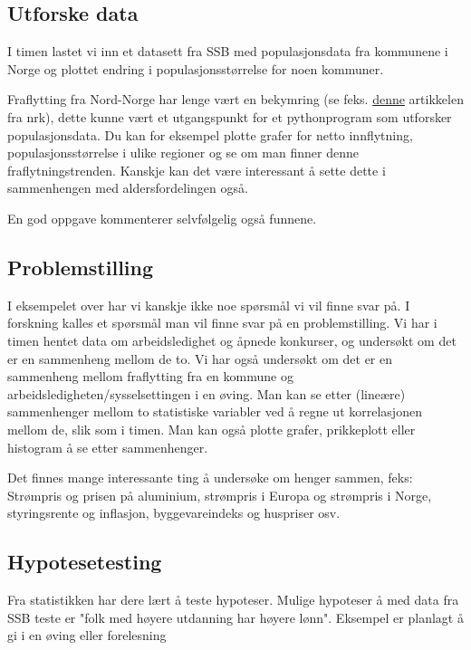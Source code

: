 \documentclass[12pt, titlepage]{article}
\begin{document}
\subsection*{Utforske data}

I timen lastet vi inn et datasett fra SSB med populasjonsdata fra kommunene i Norge og plottet endring i populasjonsstørrelse for noen kommuner.

Fraflytting fra Nord-Norge har lenge vært en bekymring (se feks. \href{https://www.nrk.no/tromsogfinnmark/4000-flyttet-fra-nord-norge-i-2022-1.16345861}{denne} artikkelen fra nrk),
dette kunne vært et utgangspunkt for et pythonprogram som utforsker populasjonsdata. Du kan for eksempel plotte grafer for netto innflytning, populasjonsstørrelse i ulike regioner og se om man finner denne fraflytningstrenden.
Kanskje kan det være interessant å sette dette i sammenhengen med aldersfordelingen også.

En god oppgave kommenterer selvfølgelig også funnene.

\subsection*{Problemstilling}

I eksempelet over har vi kanskje ikke noe spørsmål vi vil finne svar på. I forskning kalles et spørsmål man vil finne svar på en problemstilling. 
Vi har i timen hentet data om arbeidsledighet og åpnede konkurser, og undersøkt om det er en sammenheng mellom de to. Vi har også undersøkt om det er en sammenheng
mellom fraflytting fra en kommune og arbeidsledigheten/sysselsettingen i en øving.
Man kan se etter (lineære) sammenhenger mellom to statistiske variabler ved å regne ut korrelasjonen mellom de, slik som i timen. Man kan også plotte grafer, prikkeplott eller histogram
å se etter sammenhenger.

Det finnes mange interessante ting å undersøke om henger sammen, feks: Strømpris og prisen på aluminium, strømpris i Europa og strømpris i Norge, styringsrente og inflasjon,
byggevareindeks og huspriser osv.

\subsection*{Hypotesetesting}

Fra statistikken har dere lært å teste hypoteser. Mulige hypoteser å med data fra SSB teste er "folk med høyere utdanning har høyere lønn". Eksempel er planlagt å gi i en øving eller forelesning
\end{document}
